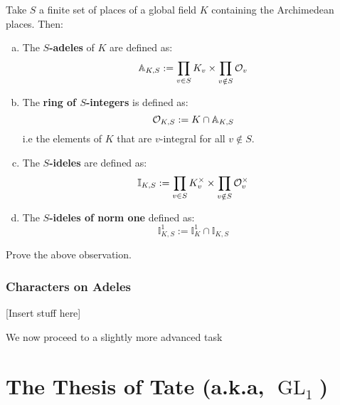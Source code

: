 \documentclass[11pt, x11names, openany]{book}
\renewcommand{\aa}{\mathbb{A}}
\newcommand{\ii}{\mathbb{I}}
\DeclareMathOperator{\GL}{GL}
\begin{document}
\begin{defn}
Take $S$ a finite set of places of a global field $K$ containing the Archimedean places. Then:
\begin{enumerate}[(a)]
    \item The \textbf{$S$-adeles} of $K$ are defined as:
    \begin{equation*}
        \aa_{K, S} := \prod_{v \in S} K_v \times \prod_{v \notin S} \calo_v
    \end{equation*}
    \item The \textbf{ring of $S$-integers} is defined as:
    \begin{equation*}
        \calo_{K, S} := K \cap \aa_{K, S}
    \end{equation*}
    i.e the elements of $K$ that are $v$-integral for all $v \notin S$.
    \item The \textbf{$S$-ideles} are defined as:
    \begin{equation*}
        \ii_{K, S} := \prod_{v \in S}K_v^\times \times \prod_{v \notin S}\calo_v^\times 
    \end{equation*}
    \item The \textbf{$S$-ideles of norm one} defined as:
    \begin{equation*}
        \ii_{K, S}^1 := \ii_K^1 \cap \ii_{K, S}
    \end{equation*}
\end{enumerate}
\end{defn}

\begin{observation}

\end{observation}

\begin{exercise}
    Prove the above observation.
\end{exercise}

\subsection{Characters on Adeles}
\label{subsection: Characters on Adeles}


[Insert stuff here]

We now proceed to a slightly more advanced task





\chapter{The Thesis of Tate (a.k.a, $\GL_1$)}
\label{chapter: Tate's thesis}
\end{document}
